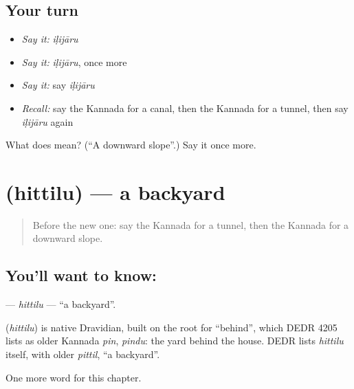 \subsection*{Your turn}
\begin{itemize}
\raggedright
  \item \emph{Say it:} \emph{iḷijāru}
  \item \emph{Say it:} \emph{iḷijāru}, once more
  \item \emph{Say it:} say \emph{iḷijāru}
  \item \emph{Recall:} say the Kannada for a canal, then the Kannada for a tunnel, then say \emph{iḷijāru} again
\end{itemize}

\begin{tcolorbox}[breakable,colback=teal!4,colframe=teal!35!black,title={Before you move on}]
What does  mean? (\textquotedblleft{}A downward slope\textquotedblright{}.) Say it once more.
\end{tcolorbox}
\section[\texorpdfstring{\kn{ಹಿತ್ತಿಲು} (hittilu)}{ಹಿತ್ತಿಲು (hittilu)}]{ (hittilu) — a backyard}

\label{lesson:KA-C251-hittilu}



\begin{quote}
Before the new one: say the Kannada for a tunnel, then the Kannada for a downward slope.
\end{quote}

\subsection*{You'll want to know: }
\textbf{} — \emph{hittilu} — \textquotedblleft{}a backyard\textquotedblright{}.

\begin{cousinweb}
\textbf{} (\emph{hittilu}) is native Dravidian, built on the root for \textquotedblleft{}behind\textquotedblright{}, which DEDR 4205 lists as older Kannada \emph{pin}, \emph{pindu}: the yard behind the house. DEDR lists \emph{hittilu} itself, with older \emph{pittil}, \textquotedblleft{}a backyard\textquotedblright{}.
\end{cousinweb}

\begin{grammarlens}[title={What you've built}]
One more word for this chapter.
\end{grammarlens}


